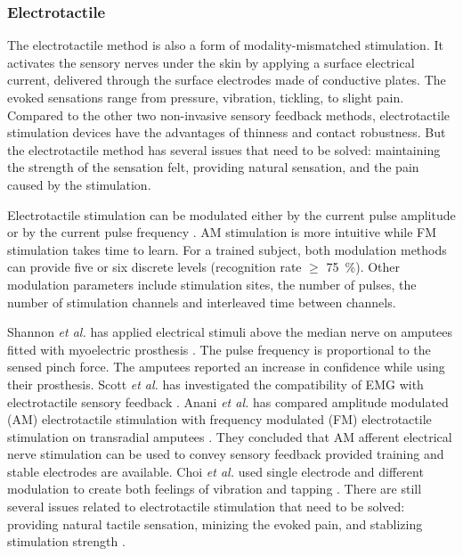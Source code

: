 \subsubsection{Electrotactile}
The electrotactile method is also a form of modality-mismatched stimulation. It activates the sensory nerves under the skin by applying a surface electrical current, delivered through the surface electrodes made of conductive plates. The evoked sensations range from pressure, vibration, tickling, to slight pain. Compared to the other two non-invasive sensory feedback methods, electrotactile stimulation devices have the advantages of thinness and contact robustness. But the electrotactile method has several issues that need to be solved: maintaining the strength of the sensation felt, providing natural sensation, and the pain caused by the stimulation.

Electrotactile stimulation can be modulated either by the current pulse amplitude or by the current pulse frequency \cite{anani1979discrimination}. AM stimulation is more intuitive while FM stimulation takes time to learn. For a trained subject, both modulation methods can provide five or six discrete levels (recognition rate $\geqslant$  \SI{75}{\%}). Other modulation parameters include stimulation sites, the number of pulses, the number of stimulation channels and interleaved time between channels.

Shannon \textit{et al.} has applied electrical stimuli above the median nerve on amputees fitted with myoelectric prosthesis \cite{shannon1979myoelectrically}. The pulse frequency is proportional to the sensed pinch force. The amputees reported an increase in confidence while using their prosthesis.
Scott \textit{et al.} has investigated the compatibility of EMG with electrotactile sensory feedback \cite{scott1980sensory}.
Anani \textit{et al.} has compared amplitude modulated (AM) electrotactile stimulation with frequency modulated (FM) electrotactile stimulation on transradial amputees \cite{anani1979discrimination}. They concluded that AM afferent electrical nerve stimulation can be used to convey sensory feedback provided training and stable electrodes are available.
Choi \textit{et al.} used single electrode and different modulation to create both feelings of vibration and tapping \cite{choi2017mixed}. 
There are still several issues related to electrotactile stimulation that need to be solved: providing natural tactile sensation, minizing the evoked pain, and stablizing stimulation strength \cite{kajimoto2016electro}. 


